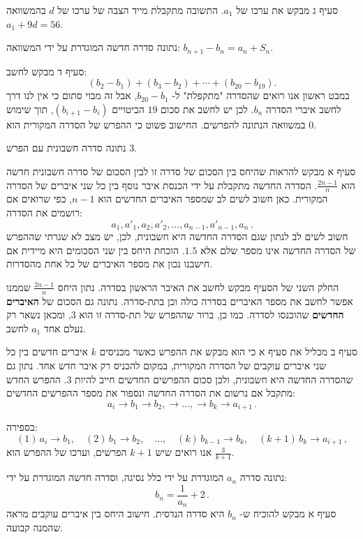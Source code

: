 \documentclass[12pt,a4paper]{article}
\begin{document}
סעיף ג מבקש את ערכו של
$a_1$.
התשובה מתקבלת מייד הצבה של ערכו של
$d$
בהמשוואה
$a_1+9d=56$.

נתונה סדרה חדשה המוגדרת על ידי המשוואה:
$b_{n+1}-b_n=a_n+S_n$.

סעיף ד מבקש לחשב:
\[
(b_2-b_1) + (b_3-b_2) + \cdots + (b_{20}-b_{19}).
\]
במבט ראשון אנו רואים שהסדרה "מתקפלת" ל-%
$b_{20}-b_1$,
אבל זה מבוי סתום כי אין לנו דרך לחשב איברי הסדרה
$b_n$.
לכן יש לחשב את סכום
$19$
הביטויים
$(b_{i+1}-b_i)$,
תוך שימוש במשוואה הנתונה להפרשים. החישוב פשוט כי ההפרש של הסדרה המקורית הוא
$0$.

\bigskip

\textbf{}
נתונה סדרה חשבונית עם הפרש
$3$.

סעיף א מבקש להראות שהיחס בין הסכום של סדרה זו לבין הסכום של סדרה חשבונית חדשה הוא 
$\frac{2n-1}{n}$.
הסדרה החדשה מתקבלת על ידי הכנסת איבר נוסף בין כל שני איברים של הסדרה המקורית. כאן חשוב לשים לב שמספר האיברים החדשים הוא
$n-1$,
כפי שרואים אם רושמים את הסדרה:
\[
a_1, a'_1, a_2, a'_2, \ldots, a_{n-1}, a'_{n-1}, a_n\,.
\]
חשוב לשים לב לנתון שגם הסדרה החדשה היא חשבונית, לכן, יש מצב לא שגרתי שההפרש של הסדרה החדשה אינו מספר שלם אלא
$1.5$.
הוכחת היחס בין שני הסכומים היא מיידית אם חישבנו נכון את מספר האיברים של כל אחת מהסדרות.

החלק השני של הסעיף מבקש לחשב את האיבר הראשון בסדרה. נתון היחס 
$\frac{2n-1}{n}$
שממנו אפשר לחשב את מספר האיברים בסדרה כולה וכן בתת-סדרה. נתונה גם הסכום של 
\textbf{האיברים החדשים}
שהוכנסו לסדרה. כמו כן, ברור שההפרש של תת-סדרה זו הוא
$3$,
ומכאן נשאר רק נעלם אחד
$a_1$
לחשב.

סעיף ב מכליל את סעיף א כי הוא מבקש את ההפרש כאשר מכניסים
$k$
איברים חדשים בין כל שני איברים עוקבים של הסדרה המקורית, במקום להכניס רק איבר חדש אחד. נתון גם שהסדרה החדשה היא חשבונית, ולכן סכום ההפרשים החדשים חייב להיות
$3$.
ההפרש החדש מתקבל אם נרשום את הסדרה החדשה ונספור את מספר ההפרשים החדשים:
\[
a_i\rightarrow b_1\rightarrow b_2, \rightarrow \ldots, \rightarrow b_k\rightarrow a_{i+1}\,.
\]

בספירה:
\[
(1)\, a_i\rightarrow b_1,\quad (2)\, b_1 \rightarrow b_2, \quad \ldots, \quad (k)\, b_{k-1} \rightarrow b_k,\quad (k+1)\, b_k\rightarrow a_{i+1}\,,
\]
אנו רואים שיש
$k+1$
הפרשים, וערכו של ההפרש הוא
$\frac{3}{k+1}$.

\bigskip

\textbf{}
נתונה סדרה
$a_n$
המוגדרת על ידי כלל נסיגה, וסדרה חדשה המוגדרת על ידי:
\[
b_n = \frac{1}{a_n} + 2\,.
\]
סעיף א מבקש להוכיח ש-%
$b_n$
היא סדרה הנדסית. חישוב היחס בין איברים עוקבים מראה שהמנה קבועה.
\end{document}
